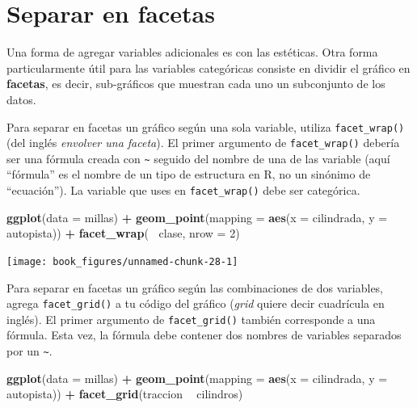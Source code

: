 \documentclass[11pt,oneside]{report}
\newenvironment{Shaded}{\begin{snugshade}}{\end{snugshade}}
\newcommand{\DataTypeTok}[1]{\textcolor[rgb]{0.13,0.29,0.53}{#1}}
\newcommand{\DecValTok}[1]{\textcolor[rgb]{0.00,0.00,0.81}{#1}}
\newcommand{\KeywordTok}[1]{\textcolor[rgb]{0.13,0.29,0.53}{\textbf{#1}}}
\newcommand{\NormalTok}[1]{#1}
\newcommand{\OperatorTok}[1]{\textcolor[rgb]{0.81,0.36,0.00}{\textbf{#1}}}
\newcommand{\StringTok}[1]{\textcolor[rgb]{0.31,0.60,0.02}{#1}}
\begin{document}
\hypertarget{separar-en-facetas}{%
\section{Separar en facetas}\label{separar-en-facetas}}

Una forma de agregar variables adicionales es con las estéticas. Otra
forma particularmente útil para las variables categóricas consiste en
dividir el gráfico en \textbf{facetas}, es decir, sub-gráficos que
muestran cada uno un subconjunto de los datos.

Para separar en facetas un gráfico según una sola variable, utiliza
\texttt{facet\_wrap()} (del inglés \emph{envolver una faceta}). El
primer argumento de \texttt{facet\_wrap()} debería ser una fórmula
creada con \texttt{\textasciitilde{}} seguido del nombre de una de las
variable (aquí ``fórmula'' es el nombre de un tipo de estructura en R,
no un sinónimo de ``ecuación''). La variable que uses en
\texttt{facet\_wrap()} debe ser categórica.

\begin{Shaded}
\begin{Highlighting}[]
\KeywordTok{ggplot}\NormalTok{(}\DataTypeTok{data =}\NormalTok{ millas) }\OperatorTok{+}
\StringTok{  }\KeywordTok{geom_point}\NormalTok{(}\DataTypeTok{mapping =} \KeywordTok{aes}\NormalTok{(}\DataTypeTok{x =}\NormalTok{ cilindrada, }\DataTypeTok{y =}\NormalTok{ autopista)) }\OperatorTok{+}
\StringTok{  }\KeywordTok{facet_wrap}\NormalTok{(}\OperatorTok{~}\StringTok{ }\NormalTok{clase, }\DataTypeTok{nrow =} \DecValTok{2}\NormalTok{)}
\end{Highlighting}
\end{Shaded}

\begin{center}\texttt{[image: book\_figures/unnamed-chunk-28-1]} \end{center}

Para separar en facetas un gráfico según las combinaciones de dos
variables, agrega \texttt{facet\_grid()} a tu código del gráfico
(\emph{grid} quiere decir cuadrícula en inglés). El primer argumento de
\texttt{facet\_grid()} también corresponde a una fórmula. Esta vez, la
fórmula debe contener dos nombres de variables separados por un
\texttt{\textasciitilde{}}.

\begin{Shaded}
\begin{Highlighting}[]
\KeywordTok{ggplot}\NormalTok{(}\DataTypeTok{data =}\NormalTok{ millas) }\OperatorTok{+}
\StringTok{  }\KeywordTok{geom_point}\NormalTok{(}\DataTypeTok{mapping =} \KeywordTok{aes}\NormalTok{(}\DataTypeTok{x =}\NormalTok{ cilindrada, }\DataTypeTok{y =}\NormalTok{ autopista)) }\OperatorTok{+}
\StringTok{  }\KeywordTok{facet_grid}\NormalTok{(traccion }\OperatorTok{~}\StringTok{ }\NormalTok{cilindros)}
\end{Highlighting}
\end{Shaded}
\end{document}
